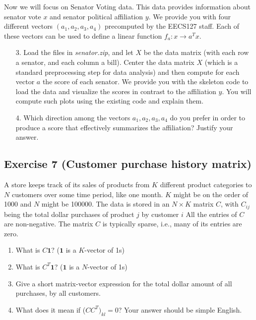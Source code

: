 \documentclass[11pt]{article}
\begin{document}
Now we will focus on Senator Voting data. This data provides information about senator vote $x$ and senator political affiliation $y$. We provide you with four different vectors $(a_1, a_2, a_3, a_4)$ precomputed by the EECS127 staff. Each of these vectors can be used to define a linear function $f_a: x \rightarrow a^Tx$.

\begin{enumerate}
    \item[3.] Load the files in \textit{senator.zip}, and let $X$ be the data matrix (with each row a senator, and each column a bill). Center the data matrix $X$ (which is a standard preprocessing step for data analysis) and then compute for each vector $a$ the score of each senator. We provide you with the skeleton code to load the data and visualize the scores in contrast to the affiliation $y$. You will compute such plots using the existing code and explain them.

    \item[4.] Which direction among the vectors $a_1, a_2, a_3, a_4$ do you prefer in order to produce a score that effectively summarizes the affiliation? Justify your answer.
\end{enumerate}

\begin{solution}
\end{solution}

\newpage
\subsection*{Exercise 7 (Customer purchase history matrix)}

A store keeps track of its sales of products from $K$ different
product categories to $N$ customers over some time period, like one month. $K$ might be on the order of 1000 and $N$ might be 100000. The data is stored in an $N \times K$ matrix $C$, with $C_{ij}$ being the total dollar purchases of product $j$ by customer $i$ All the entries of $C$ are non-negative. The matrix $C$ is typically sparse, i.e., many of its entries are zero.

\begin{enumerate}
    \item What is $C \boldsymbol{1}$? ($\boldsymbol{1}$ is a $K$-vector of 1s)

    \item What is $C^T \boldsymbol{1}$? ($\boldsymbol{1}$ is a $N$-vector of 1s)

    \item Give a short matrix-vector expression for the total dollar amount of all purchases, by all customers.

    \item What does it mean if ($CC^T)_{kl} = 0$? Your answer should be simple English.
\end{enumerate}
\end{document}
